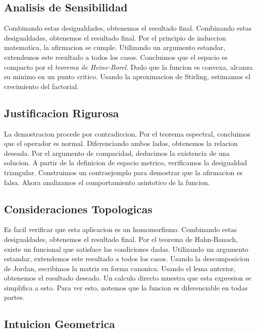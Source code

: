 \documentclass[
]{article}
\begin{document}
\subsection{Analisis de Sensibilidad}\label{analisis-de-sensibilidad}

Combinando estas desigualdades, obtenemos el resultado final. Combinando
estas desigualdades, obtenemos el resultado final. Por el principio de
induccion matematica, la afirmacion se cumple. Utilizando un argumento
estandar, extendemos este resultado a todos los casos. Concluimos que el
espacio es compacto por el \emph{teorema de Heine-Borel}. Dado que la
funcion es convexa, alcanza su minimo en un punto critico. Usando la
aproximacion de Stirling, estimamos el crecimiento del factorial.

\subsection{Justificacion Rigurosa}\label{justificacion-rigurosa}

La demostracion procede por contradiccion. Por el teorema espectral,
concluimos que el operador es normal. Diferenciando ambos lados,
obtenemos la relacion deseada. Por el argumento de compacidad, deducimos
la existencia de una solucion. A partir de la definicion de espacio
metrico, verificamos la desigualdad triangular. Construimos un
contraejemplo para demostrar que la afirmacion es falsa. Ahora
analizamos el comportamiento asintotico de la funcion.

\subsection{Consideraciones
Topologicas}\label{consideraciones-topologicas}

Es facil verificar que esta aplicacion es un homomorfismo. Combinando
estas desigualdades, obtenemos el resultado final. Por el teorema de
Hahn-Banach, existe un funcional que satisface las condiciones dadas.
Utilizando un argumento estandar, extendemos este resultado a todos los
casos. Usando la descomposicion de Jordan, escribimos la matriz en forma
canonica. Usando el lema anterior, obtenemos el resultado deseado. Un
calculo directo muestra que esta expresion se simplifica a esto. Para
ver esto, notemos que la funcion es diferenciable en todas partes.

\subsection{Intuicion Geometrica}\label{intuicion-geometrica}
\end{document}
